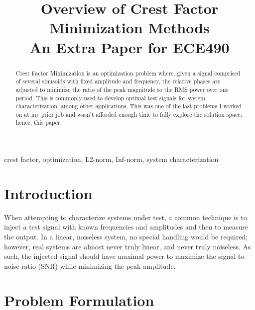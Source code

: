 \documentclass[conference]{IEEEtran}
\begin{document}
\title{Overview of Crest Factor Minimization Methods\\
{\footnotesize An Extra Paper for ECE490}
}

\author{
}

\maketitle

\begin{abstract}
    Crest Factor Minimization is an optimization problem where, given a signal comprised of
    several sinusoids with fixed amplitude and frequency, the relative phases are adjusted
    to minimize the ratio of the peak magnitude to the RMS power over one period. This is
    commonly used to develop optimal test signals for system characterization, among
    other applications. This was one of the last problems I worked on at my prior job
    and wasn't afforded enough time to fully explore the solution space; hence, this paper.
\end{abstract}

\begin{IEEEkeywords}
    crest factor, optimization, L2-norm, Inf-norm, system characterization
\end{IEEEkeywords}

\section{Introduction}
When attempting to characterize systems under test, a common technique is to inject
a test signal with known frequencies and amplitudes and then to measure the output. In
a linear, noiseless system, no special handling would be required; however, real systems
are almost never truly linear, and never truly noiseless. As such, the injected signal
should have maximal power to maximize the signal-to-noise ratio (SNR) while minimizing
the peak amplitude.


\section{Problem Formulation}
\end{document}
